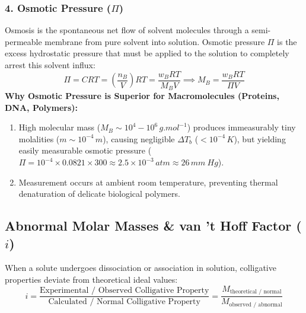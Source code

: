 \documentclass[10pt,a4paper]{article}
\begin{document}
\subsubsection{4. Osmotic Pressure ($\Pi$)}
Osmosis is the spontaneous net flow of solvent molecules through a semi-permeable membrane from pure solvent into solution. Osmotic pressure $\Pi$ is the excess hydrostatic pressure that must be applied to the solution to completely arrest this solvent influx:
\begin{equation}
  \Pi = C R T = \left(\frac{n_B}{V}\right) R T = \frac{w_B R T}{M_B V} \implies M_B = \frac{w_B R T}{\Pi V}
\end{equation}
\textbf{Why Osmotic Pressure is Superior for Macromolecules (Proteins, DNA, Polymers):}
\begin{enumerate}
  \item High molecular mass ($M_B \sim 10^4 - 10^6\,\si{g.mol^{-1}}$) produces immeasurably tiny molalities ($m \sim 10^{-4}\,\si{m}$), causing negligible $\Delta T_b$ ($< 10^{-4}\,\si{K}$), but yielding easily measurable osmotic pressure ($\Pi = 10^{-4} \times 0.0821 \times 300 \approx 2.5 \times 10^{-3}\,\si{atm} \approx 26\,\si{mm\ Hg}$).
  \item Measurement occurs at ambient room temperature, preventing thermal denaturation of delicate biological polymers.
\end{enumerate}

\subsection{Abnormal Molar Masses \& van 't Hoff Factor ($i$)}
When a solute undergoes dissociation or association in solution, colligative properties deviate from theoretical ideal values:
\begin{equation}
  i = \frac{\text{Experimental / Observed Colligative Property}}{\text{Calculated / Normal Colligative Property}} = \frac{M_{\text{theoretical / normal}}}{M_{\text{observed / abnormal}}}
\end{equation}
\end{document}
